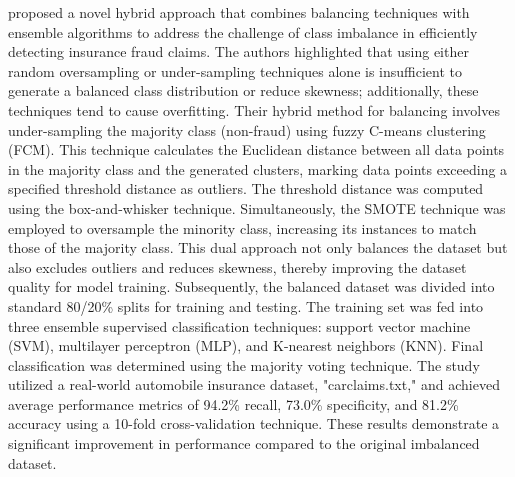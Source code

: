\documentclass[twoside,11pt]{article}
\begin{document}
\cite{Padhi2020} proposed a novel hybrid approach that combines balancing techniques with ensemble algorithms to address the challenge of class imbalance in efficiently detecting insurance fraud claims. The authors highlighted that using either random oversampling or under-sampling techniques alone is insufficient to generate a balanced class distribution or reduce skewness; additionally, these techniques tend to cause overfitting. Their hybrid method for balancing involves under-sampling the majority class (non-fraud) using fuzzy C-means clustering (FCM). This technique calculates the Euclidean distance between all data points in the majority class and the generated clusters, marking data points exceeding a specified threshold distance as outliers. The threshold distance was computed using the box-and-whisker technique. Simultaneously, the SMOTE technique was employed to oversample the minority class, increasing its instances to match those of the majority class. This dual approach not only balances the dataset but also excludes outliers and reduces skewness, thereby improving the dataset quality for model training. Subsequently, the balanced dataset was divided into standard 80/20\% splits for training and testing. The training set was fed into three ensemble supervised classification techniques: support vector machine (SVM), multilayer perceptron (MLP), and K-nearest neighbors (KNN). Final classification was determined using the majority voting technique. The study utilized a real-world automobile insurance dataset, "carclaims.txt," and achieved average performance metrics of 94.2\% recall, 73.0\% specificity, and 81.2\% accuracy using a 10-fold cross-validation technique. These results demonstrate a significant improvement in performance compared to the original imbalanced dataset.
\end{document}
